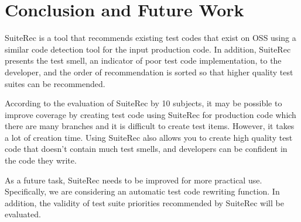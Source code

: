 \documentclass[conference]{IEEEtran}
\begin{document}
\section{Conclusion and Future Work}
SuiteRec is a tool that recommends existing test codes that exist on OSS using a similar code detection tool for the input production code. In addition, SuiteRec presents the test smell, an indicator of poor test code implementation, to the developer, and the order of recommendation is sorted so that higher quality test suites can be recommended.

According to the evaluation of SuiteRec by 10 subjects, it may be possible to improve coverage by creating test code using SuiteRec for production code which there are many branches and it is difficult to create test items. However, it takes a lot of creation time. Using SuiteRec also allows you to create high quality test code that doesn't contain much test smells, and developers can be confident in the code they write. 

As a future task, SuiteRec needs to be improved for more practical use. Specifically, we are considering an automatic test code rewriting function. In addition, the validity of test suite priorities recommended by SuiteRec will be evaluated.
\end{document}
